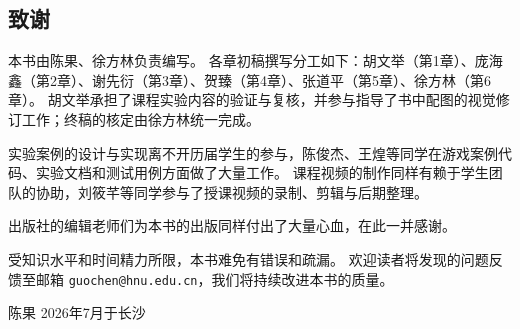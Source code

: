 \subsection*{致谢}

本书由陈果、徐方林负责编写。
各章初稿撰写分工如下：胡文举（第1章）、庞海鑫（第2章）、谢先衍（第3章）、贺臻（第4章）、张道平（第5章）、徐方林（第6章）。
胡文举承担了课程实验内容的验证与复核，并参与指导了书中配图的视觉修订工作；终稿的核定由徐方林统一完成。

实验案例的设计与实现离不开历届学生的参与，陈俊杰、王煌等同学在游戏案例代码、实验文档和测试用例方面做了大量工作。
课程视频的制作同样有赖于学生团队的协助，刘筱芊等同学参与了授课视频的录制、剪辑与后期整理。

出版社的编辑老师们为本书的出版同样付出了大量心血，在此一并感谢。

受知识水平和时间精力所限，本书难免有错误和疏漏。
欢迎读者将发现的问题反馈至邮箱 \texttt{guochen@hnu.edu.cn}，我们将持续改进本书的质量。

\vspace{2em}

\begin{flushright}
陈果 2026年7月于长沙
\end{flushright}

